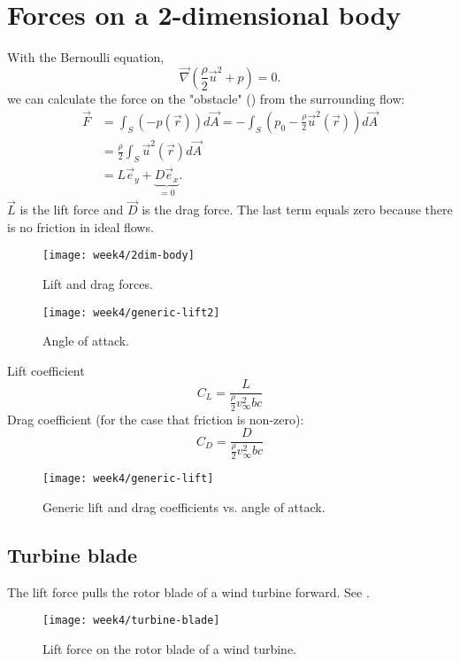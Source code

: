 \section{Forces on a 2-dimensional body}

With the Bernoulli equation, 
\begin{equation}
\vec{\nabla}\left(\frac{\rho}{2}\vec{u}^2+p\right)=0.
\end{equation}
we can calculate the force on the "obstacle" () from the surrounding flow:
\begin{align}
\vec{F} &= \int_{S}(-p(\vec{r}))d\vec{A} = -\int_{S}\left(p_0-\frac{\rho}{2}\vec{u}^2(\vec{r})\right)d\vec{A} \\
&= \frac{\rho}{2}\int_{S}\vec{u}^2(\vec{r})d\vec{A}\\
&= L\vec{e}_y +\underbrace{D\vec{e}_x}_{=0}.
\end{align}
$\vec{L}$ is the lift force and $\vec{D}$ is the drag force. The last term equals zero because there is no friction in ideal flows.

\begin{figure}[!h]
    \centering
    \texttt{[image: week4/2dim-body]}\\
    \caption{Lift and drag forces.}
    \label{fig:2dim-body}
\end{figure}

\begin{figure}[!h]
    \centering
    \texttt{[image: week4/generic-lift2]}\\
    \caption{Angle of attack.}
    \label{fig:generic-lift2}
\end{figure}

Lift coefficient
\begin{equation}
C_L = \frac{L}{\frac{\rho}{2}v_\infty^2 b c}
\end{equation}
Drag coefficient (for the case that friction is non-zero):
\begin{equation}
C_D = \frac{D}{\frac{\rho}{2}v_\infty^2 b c}
\end{equation}

\begin{figure}[!h]
    \centering
    \texttt{[image: week4/generic-lift]}\\
    \caption{Generic lift and drag coefficients vs. angle of attack.}
    \label{fig:generic-lift}
\end{figure}


\subsection{Turbine blade}
The lift force pulls the rotor blade of a wind turbine forward. See .
\begin{figure}[!h]
    \centering
    \texttt{[image: week4/turbine-blade]}\\
    \caption{Lift force on the rotor blade of a wind turbine.}
    \label{fig:turbine-blade}
\end{figure}


